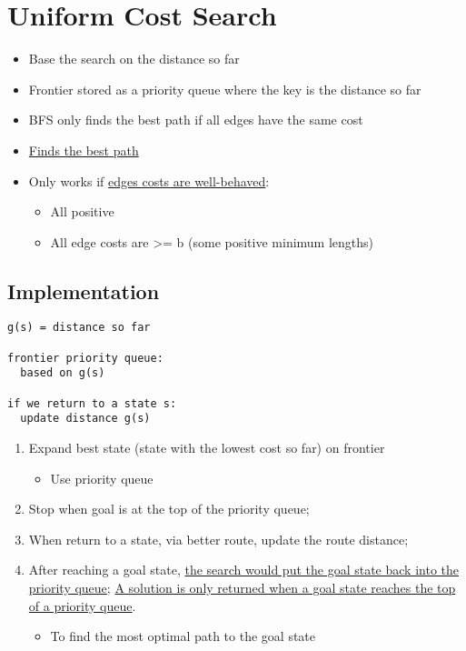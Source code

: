 \section{Uniform Cost Search}

  \begin{itemize}
    \item Base the search on the distance so far
    \item Frontier stored as a priority queue where the key is the distance so far
    \item BFS only finds the best path if all edges have the same cost
    \item \ul{Finds the best path}
    \item Only works if \ul{edges costs are well-behaved}:
    \begin{itemize}
      \item All positive
      \item All edge costs are >= b (some positive minimum lengths)
    \end{itemize}
  \end{itemize}

  \subsection{Implementation}

    \begin{lstlisting}[style=pseudo]
g(s) = distance so far

frontier priority queue:
  based on g(s)

if we return to a state s:
  update distance g(s)
    \end{lstlisting}

    \begin{enumerate}
      \item Expand best state (state with the lowest cost so far) on frontier
      \begin{itemize}
        \item Use priority queue
      \end{itemize}

      \item Stop when goal is at the top of the priority queue;
      \item When return to a state, via better route, update the route distance;
      \item After reaching a goal state, \ul{the search would put the
      goal state back into the priority queue}; \ul{A solution is only
      returned when a goal state reaches the top of a priority queue}.
      \begin{itemize}
        \item To find the most optimal path to the goal state
      \end{itemize}
    \end{enumerate}